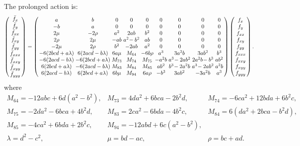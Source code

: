 \documentclass[review,onefignum,onetabnum]{siamonline190516}
\begin{document}
The prolonged action is:
\begin{equation}
\arraycolsep=1.4pt
\left(
\begin{array}{c}
  \bar f_x \\ \bar f_y \\ \bar f_{xx} \\ \bar f_{xy} \\ \bar f_{yy} \\ \bar f_{xxx} \\ \bar f_{xxy} \\ \bar f_{xyy} \\ \bar f_{yyy} 
 \end{array}
 \right)
 = 
\left(
\begin{array}{ccccccccc}
 a & b & 0 & 0 & 0 & 0 & 0 & 0 & 0 \\
 -b & a & 0 & 0 & 0 & 0 & 0 & 0 & 0 \\
 2\mu & -2 \rho & a^2 & 2 a b & b^2 & 0 & 0 & 0 & 0 \\
 2 \rho & 2\mu & -a b & a^2\!-b^2 & a b & 0 & 0 & 0 & 0 \\
 -2\mu & 2 \rho & b^2 & -2 a b & a^2 & 0 & 0 & 0 & 0 \\
 -6 (2 b c d+a \lambda) & 6 (2 a c d-b\lambda) & 6 a \mu &
  M_{64}  & -6 b \rho & a^3 & 3 a^2 b & 3 a b^2 & b^3 \\
 -6 (2 a c d-b\lambda) & -6 (2 b c d+a \lambda) & M_{73}& M_{74} & 
 M_{75} & -a^2 b & a^3\!-2 a b^2 & 2
   a^2 b\!-b^3 & a b^2 \\
 6 (2 b c d+a \lambda) & -6 (2 a c d-b\lambda) & M_{83} & M_{84} & M_{85} & a b^2 & b^3\!-2
   a^2 b & a^3\!-2 a b^2 & a^2 b \\
 6 (2 a c d-b\lambda) & 6 (2 b c d+a \lambda) & 6 b \mu & 
  M_{94} & 6 a \rho & -b^3 & 3 a b^2 & -3 a^2 b & a^3 \\
\end{array}
\right)\left(
\begin{array}{c}
f_x \\ f_y \\ f_{xx} \\ f_{xy} \\ f_{yy} \\ f_{xxx} \\ f_{xxy} \\ f_{xyy} \\ f_{yyy} 
 \end{array}
 \right).
\label{eqn:mobius}
 \end{equation}
 where
 \begin{equation*}
 \begin{array}{lll}
M_{64}=-12abc+6d(a^2-b^2), & 
M_{73}=4 d a^2+6 b c a-2 b^2 d, & 
M_{74}=-6 c a^2+12 b d a+6 b^2 c, \\
 M_{75}=-2 d a^2-6 b c a+4 b^2 d, &
 M_{83}=2 c a^2-6 b d a-4 b^2 c, &
 M_{84}=6 (d a^2+2 b c a-b^2 d),\\
 M_{85}=-4 c a^2+6 b d a+2 b^2 c,& 
 M_{94}= -12a b d + 6c(a^2-b^2),\\
\lambda=d^2-c^2, & 
\mu = b d - a c, & 
\rho = b c + a d.
\end{array}
\end{equation*}
\end{document}
